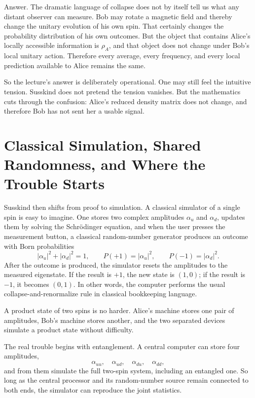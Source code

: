 Answer. The dramatic language of collapse does not by itself tell us what any distant observer can measure. Bob may rotate a magnetic field and thereby change the unitary evolution of his own spin. That certainly changes the probability distribution of his own outcomes. But the object that contains Alice's locally accessible information is \(\rho_A\), and that object does not change under Bob's local unitary action. Therefore every average, every frequency, and every local prediction available to Alice remains the same.

So the lecture's answer is deliberately operational. One may still feel the intuitive tension. Susskind does not pretend the tension vanishes. But the mathematics cuts through the confusion: Alice's reduced density matrix does not change, and therefore Bob has not sent her a usable signal.

\section{Classical Simulation, Shared Randomness, and Where the Trouble Starts}

Susskind then shifts from proof to simulation. A classical simulator of a single spin is easy to imagine. One stores two complex amplitudes \(\alpha_u\) and \(\alpha_d\), updates them by solving the Schr\"odinger equation, and when the user presses the measurement button, a classical random-number generator produces an outcome with Born probabilities
\begin{equation}
|\alpha_u|^2+|\alpha_d|^2=1,\qquad
P(+1)=|\alpha_u|^2,\qquad
P(-1)=|\alpha_d|^2.
\end{equation}
After the outcome is produced, the simulator resets the amplitudes to the measured eigenstate. If the result is \(+1\), the new state is \((1,0)\); if the result is \(-1\), it becomes \((0,1)\). In other words, the computer performs the usual collapse-and-renormalize rule in classical bookkeeping language.

A product state of two spins is no harder. Alice's machine stores one pair of amplitudes, Bob's machine stores another, and the two separated devices simulate a product state without difficulty.

The real trouble begins with entanglement. A central computer can store four amplitudes,
\begin{equation}
\alpha_{uu},\quad \alpha_{ud},\quad \alpha_{du},\quad \alpha_{dd},
\end{equation}
and from them simulate the full two-spin system, including an entangled one. So long as the central processor and its random-number source remain connected to both ends, the simulator can reproduce the joint statistics.


